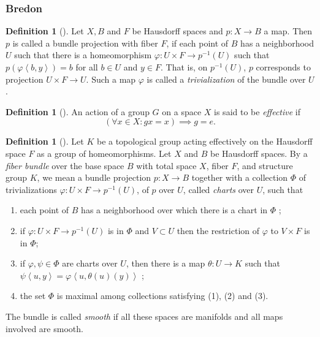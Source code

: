 \documentclass[reqno]{amsart}
\theoremstyle{definition}
\newtheorem{definition}[theorem]{Definition}
\theoremstyle{remark}
\begin{document}
\subsubsection{Bredon}

\begin{definition}[]
    Let $X, B$ and $F$ be Hausdorff spaces and
    $p \colon X \to B$ a map.
    Then $p$ is called a bundle projection with
    fiber $F$, if each point of
    $B$ has a neighborhood $U$ such that there
    is a homeomorphism $\varphi \colon U \times F \to 
    p^{-1}(U) $ such that $p \left( \varphi
    \left<b,y  \right>\right) = b$ for all $b \in U$ and
    $y \in F$. That is, on  $p^{-1}(U)$, $p$ corresponds
    to projection $U \times F \to U$. Such a map
    $\varphi $ is called a \textit{trivialization} of the
    bundle over $U$.
\end{definition}

\begin{definition}[]
    An action of a group $G$ on a space $X$ is
    said to be \textit{effective} if
    \[
        \left( \forall x \in X \colon
        gx = x \right) \implies g = e.
    \] 
\end{definition}

\begin{definition}[]
    Let $K$ be a topological group acting effectively on
    the Hausdorff space $F$ as a group of homeomorphisms.
    Let $X$ and $B$ be Hausdorff spaces. By a 
    \textit{fiber bundle} over the base space $B$ with
    total space $X$, fiber $F$, and
    structure group $K$, we mean a bundle projection
    $p \colon X \to B$ together with a collection
    $\Phi $ of trivializations $\varphi \colon
    U \times F \to p^{-1}(U)$, of $p$ over $U$, called
    \textit{charts} over $U$, such that
    \begin{enumerate}
        \item each point of $B$ has a neighborhood
            over which there is a chart in $\Phi $ ;
        \item if $\varphi \colon U \times F \to 
            p^{-1}(U)$ is in $\Phi $ and
            $V \subset U$ then the restriction
            of $\varphi $ to $V \times F$ is in $\Phi$;
        \item if $\varphi, \psi \in \Phi$ are
            charts over $U$, then there is a map
            $\theta \colon U \to K$ such that
            $\psi \left<u,y \right> = 
            \varphi \left<u , \theta(u) (y) \right>$ ;
        \item the set $\Phi $ is maximal among
            collections satisfying (1), (2) and (3).
    \end{enumerate}

    The bundle is called \textit{smooth} if all these spaces
    are manifolds and all maps involved are smooth.
\end{definition}
\end{document}
